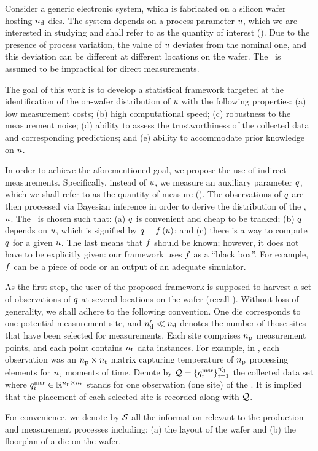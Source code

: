 Consider a generic electronic system, which is fabricated on a silicon wafer hosting ${n_\text{d}}$ dies.
The system depends on a process parameter $u$, which we are interested in studying and shall refer to as the quantity of interest (\qoi).
Due to the presence of process variation, the value of $u$ deviates from the nominal one, and this deviation can be different at different locations on the wafer.
The \qoi\ is assumed to be impractical for direct measurements.

The goal of this work is to develop a statistical framework targeted at the identification of the on-wafer distribution of $u$ with the following properties: (a) low measurement costs; (b) high computational speed; (c) robustness to the measurement noise; (d) ability to assess the trustworthiness of the collected data and corresponding predictions; and (e) ability to accommodate prior knowledge on $u$.

In order to achieve the aforementioned goal, we propose the use of indirect measurements.
Specifically, instead of $u$, we measure an auxiliary parameter $q$, which we shall refer to as the quantity of measure (\qom).
The observations of $q$ are then processed via Bayesian inference in order to derive the distribution of the \qoi, $u$.
The \qom\ is chosen such that: (a) $q$ is convenient and cheap to be tracked; (b) $q$ depends on $u$, which is signified by $\q = \oBB{\u}$; and (c) there is a way to compute $q$ for a given $u$.
The last means that $\oBB$ should be known; however, it does not have to be explicitly given: our framework uses $\oBB$ as a ``black box''.
For example, $\oBB$ can be a piece of code or an output of an adequate simulator.

As the first step, the user of the proposed framework is supposed to harvest a set of observations of $q$ at several locations on the wafer (recall ).
Without loss of generality, we shall adhere to the following convention.
One die corresponds to one potential measurement site, and ${n_\text{d}'} \ll {n_\text{d}}$ denotes the number of those sites that have been selected for measurements.
Each site comprises ${n_\text{p}}$ measurement points, and each point contains ${n_\text{t}}$ data instances.
For example, in , each observation was an ${n_\text{p}} \times {n_\text{t}}$ matrix capturing temperature of ${n_\text{p}}$ processing elements for ${n_\text{t}}$ moments of time.
Denote by $\mathcal{Q} = \{ q_i^{\text{msr}} \}_{i = 1}^{n_\text{d}'}$ the collected data set where $q_i^{\text{msr}} \in \mathbb{R}^{{n_\text{p}} \times {n_\text{t}}}$ stands for one observation (one site) of the \qom.
It is implied that the placement of each selected site is recorded along with $\mathcal{Q}$.

For convenience, we denote by $\mathcal{S}$ all the information relevant to the production and measurement processes including: (a) the layout of the wafer and (b) the floorplan of a die on the wafer.
